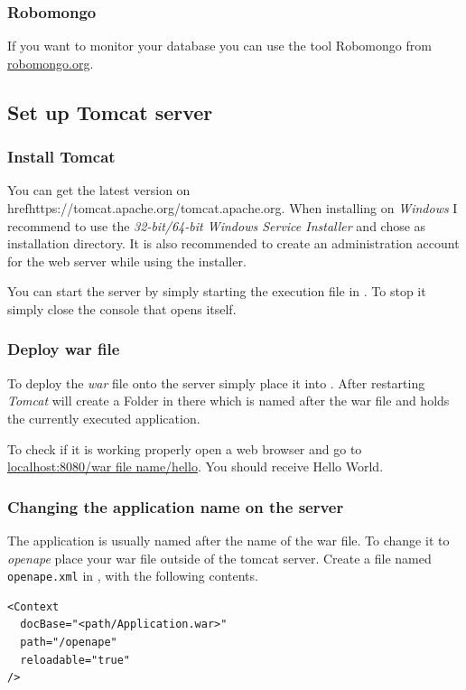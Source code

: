 \documentclass[10pt]{article}
\begin{document}
\subsubsection{Robomongo} If you want to monitor your database you can use the tool Robomongo from \href{https://robomongo.org/}{robomongo.org}.
\subsection{Set up Tomcat server}
\subsubsection{Install Tomcat} You can get the latest version on href{https://tomcat.apache.org/}{tomcat.apache.org}. When installing on \emph{Windows} I recommend to use the \emph{32-bit/64-bit Windows Service Installer} and chose  as installation directory. It is also recommended to create an administration account for the web server while using the installer.

You can start the server by simply starting the execution file in . To stop it simply close the console that opens itself.
\subsubsection{Deploy war file} To deploy the \emph{war} file onto the server simply place it into . After restarting \emph{Tomcat} will create a Folder in there which is named after the war file and holds the currently executed application.

To check if it is working properly open a web browser and go to \href{http://localhost:8080/}{localhost:8080/war file name/hello}. You should receive Hello World.
\subsubsection{Changing the application name on the server} The application is usually named after the name of the war file. To change it to \emph{openape} place your war file outside of the tomcat server. Create a file named \texttt{openape.xml} in , with the following contents.
\begin{lstlisting}
<Context 
  docBase="<path/Application.war>" 
  path="/openape" 
  reloadable="true" 
/>
\end{lstlisting}
\end{document}

